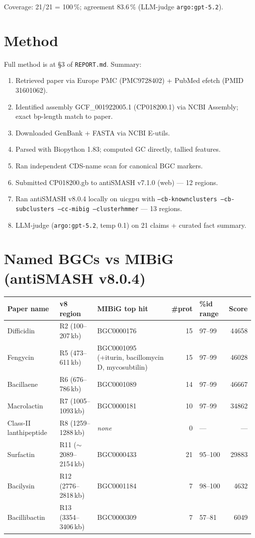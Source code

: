 \documentclass[11pt]{article}
\begin{document}
\noindent Coverage: 21/21 = 100\,\%; agreement 83.6\,\% (LLM-judge \texttt{argo:gpt-5.2}).

\section{Method}
Full method is at \S3 of \texttt{REPORT.md}. Summary:
\begin{enumerate}
\item Retrieved paper via Europe PMC (PMC9728402) + PubMed efetch (PMID 31601062).
\item Identified assembly GCF\_001922005.1 (CP018200.1) via NCBI Assembly; exact bp-length match to paper.
\item Downloaded GenBank + FASTA via NCBI E-utils.
\item Parsed with Biopython 1.83; computed GC directly, tallied features.
\item Ran independent CDS-name scan for canonical BGC markers.
\item Submitted CP018200.gb to antiSMASH v7.1.0 (web) --- 12 regions.
\item Ran antiSMASH v8.0.4 locally on uicgpu with \texttt{--cb-knownclusters --cb-subclusters --cc-mibig --clusterhmmer} --- 13 regions.
\item LLM-judge (\texttt{argo:gpt-5.2}, temp 0.1) on 21 claims + curated fact summary.
\end{enumerate}

\section{Named BGCs vs MIBiG (antiSMASH v8.0.4)}
\begin{longtable}{p{2.5cm}p{2.6cm}p{3.2cm}rp{1.6cm}r}
\toprule
Paper name & v8 region & MIBiG top hit & \#prot & \%id range & Score \\
\midrule
Difficidin & R2 (100--207\,kb) & BGC0000176 & 15 & 97--99 & 44658 \\
Fengycin & R5 (473--611\,kb) & BGC0001095 (+iturin, bacillomycin D, mycosubtilin) & 15 & 97--99 & 46028 \\
Bacillaene & R6 (676--786\,kb) & BGC0001089 & 14 & 97--99 & 46667 \\
Macrolactin & R7 (1005--1093\,kb) & BGC0000181 & 10 & 97--99 & 34862 \\
Class-II lanthipeptide & R8 (1259--1288\,kb) & \emph{none} & 0 & --- & --- \\
Surfactin & R11 ($\sim$2089--2154\,kb) & BGC0000433 & 21 & 95--100 & 29883 \\
Bacilysin & R12 (2776--2818\,kb) & BGC0001184 & 7 & 98--100 & 4632 \\
Bacillibactin & R13 (3354--3406\,kb) & BGC0000309 & 7 & 57--81 & 6049 \\
\bottomrule
\end{longtable}
\end{document}
